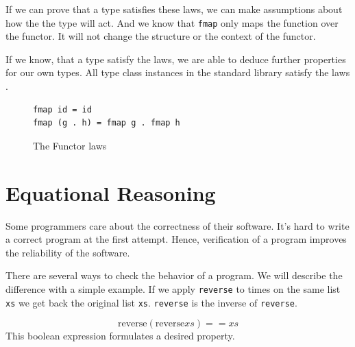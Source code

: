 \documentclass[twoside, a4paper]{article}
\begin{document}
If we can prove that a type satisfies these laws, we can make assumptions about how the the type will act. And we know that \verb|fmap| only maps the function over the functor. It will not change the structure or the context of the functor.

If we know, that a type satisfy the laws, we are able to deduce further properties for our own types. All type class instances in the standard library satisfy the laws \cite{yorgey}.

\begin{figure}
  \centering
\begin{verbatim}
fmap id = id
fmap (g . h) = fmap g . fmap h
\end{verbatim}
  \caption{The Functor laws}
  \label{fig:functorlaws}
\end{figure}

\section{Equational Reasoning}
\label{sec:equationalreasoning}

Some programmers care about the correctness of their software. It's hard to write a correct program at the first attempt. 
Hence, verification of a program improves the reliability of the software.

There are several ways to check the behavior of a program. 
We will describe the difference with a simple example.
If we apply \verb|reverse| to times on the same list \verb|xs| we get back the original list \verb|xs|. \verb|reverse| is the inverse of \verb|reverse|. 

\begin{equation}
  \label{eq:reverse_prop}
\text{reverse} (\text{reverse} xs) == xs  
\end{equation}
This boolean expression formulates a desired property. 
\end{document}
